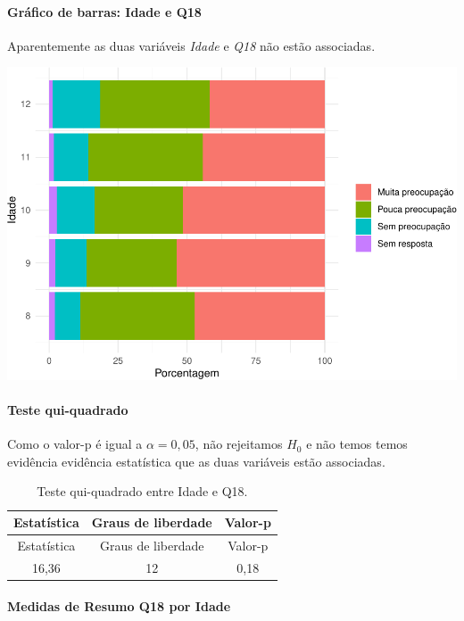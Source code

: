 \documentclass[]{article}
\let\oldparagraph\paragraph
\renewcommand{\paragraph}[1]{\oldparagraph{#1}\mbox{}}
\begin{document}
\hypertarget{gruxe1fico-de-barras-idade-e-q18}{%
\paragraph{Gráfico de barras: Idade e Q18}\label{gruxe1fico-de-barras-idade-e-q18}}

Aparentemente as duas variáveis \emph{Idade} e \emph{Q18} não estão associadas.

\begin{center}\includegraphics[width=0.75\linewidth]{relatorio_files/figure-latex/unnamed-chunk-234-1} \end{center}

\hypertarget{teste-qui-quadrado-25}{%
\paragraph{Teste qui-quadrado}\label{teste-qui-quadrado-25}}

Como o valor-p é igual a \(\alpha=0,05\), não rejeitamos \(H_0\) e não temos temos evidência evidência estatística que as duas variáveis estão associadas.

\begin{longtable}[]{@{}ccc@{}}
\caption{\label{tab:unnamed-chunk-235}Teste qui-quadrado entre Idade e Q18.}\tabularnewline
\toprule
Estatística & Graus de liberdade & Valor-p\tabularnewline
\midrule
\endfirsthead
\toprule
Estatística & Graus de liberdade & Valor-p\tabularnewline
\midrule
\endhead
16,36 & 12 & 0,18\tabularnewline
\bottomrule
\end{longtable}

\cleardoublepage

\hypertarget{medidas-de-resumo-q18-por-idade}{%
\paragraph{Medidas de Resumo Q18 por Idade}\label{medidas-de-resumo-q18-por-idade}}
\end{document}
